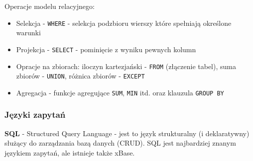 \documentclass[a4paper,12pt,oneside]{book}
\begin{document}
			\noindent Operacje modelu relacyjnego:
			\begin{itemize}
				\itemsep 0em
				\item Selekcja - \verb*|WHERE| - selekcja podzbioru wierszy które spełniają określone warunki
				\item Projekcja - \verb*|SELECT| - pominięcie z wyniku pewnych kolumn
				\item Opracje na zbiorach: iloczyn kartezjański - \verb*|FROM| (złączenie tabel), suma zbiorów - \verb*|UNION|, różnica zbiorów - \verb*|EXCEPT|
				\item Agregacja - funkcje agregujące \verb*|SUM|, \verb*|MIN| itd. oraz klauzula \verb*|GROUP BY|
			\end{itemize}
			
			\newpage \subsubsection{Języki zapytań}
			\textbf{SQL} - Structured Query Language - jest to język strukturalny (i deklaratywny) służący do zarządzania bazą danych (CRUD). SQL jest najbardziej znanym językiem zapytań, ale istnieje także xBase.
			
\end{document}
